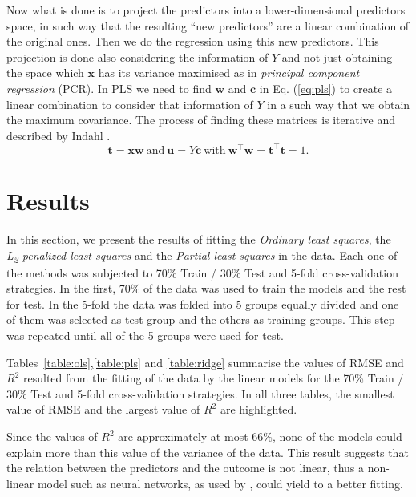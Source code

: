 \documentclass[conference]{IEEEtran}
\begin{document}
Now what is done is to project the predictors into a lower-dimensional predictors space, in such way that the resulting ``new predictors'' are a linear combination of the original ones. Then we do the regression using this new predictors. This projection is done also considering the information of $Y$ and not just obtaining the space which $\mathbf{x}$ has its variance maximised as in \emph{principal component regression} (PCR). In PLS we need to find $\mathbf{w}$ and $\mathbf{c}$ in Eq. (\ref{eq:pls}) to create a linear combination to consider that information of $Y$ in a such way that we obtain the maximum covariance. The process of finding these matrices is iterative and described by Indahl \cite{b8}.
%
\begin{equation}
\mathbf{t} = \mathbf{x}\mathbf{w}\ \text{and}\ \mathbf{u}=Y\mathbf{c}\ \text{with}\ \textbf{w}^\top\textbf{w}=\textbf{t}^\top\textbf{t}=1.
\label{eq:pls}
\end{equation}

\section{Results} \label{sec:results}

In this section, we present the results of fitting the \emph{Ordinary least squares}, the \emph{L\textsubscript{2}-penalized least squares} and the \emph{Partial least squares} in the data. Each one of the methods was subjected to 70\% Train / 30\% Test and 5-fold cross-validation strategies. In the first, 70\% of the data was used to train the models and the rest for test. In the 5-fold the data was folded into 5 groups equally divided and one of them was selected as test group and the others as training groups. This step was repeated until all of the 5 groups were used for test.

%
 
%

%


Tables~\ref{table:ols},\ref{table:pls} and \ref{table:ridge} summarise the values of RMSE and $R^2$ resulted from the fitting of the data by the linear models for the 70\% Train / 30\% Test and 5-fold cross-validation strategies. In all three tables, the smallest value of RMSE and the largest value of $R^2$ are highlighted.

Since the values of $R^2$ are approximately at most 66\%, none of the models could explain more than this value of the variance of the data. This result suggests that the relation between the predictors and the outcome is not linear, thus a non-linear model such as neural networks, as used by \cite{b4}, could yield to a better fitting. 
\end{document}
